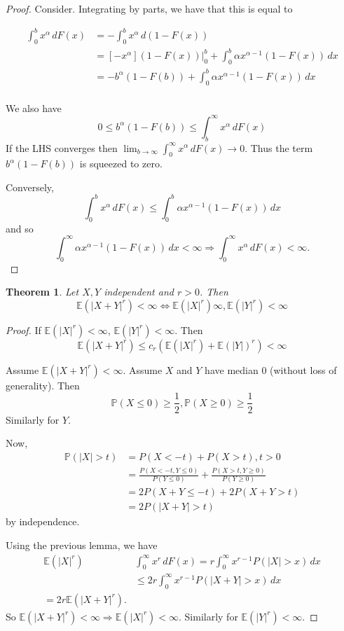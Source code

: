 \documentclass[10pt, oneside, reqno]{amsart}
\theoremstyle{plain}%
\newtheorem{thm}{Theorem}[section]
\theoremstyle{definition}
\theoremstyle{remark}
\newcommand{\E}{\mathbb{E}}
\renewcommand{\P}{\mathbb{P}}
\begin{document}
\begin{proof}
	Consider.  Integrating by parts, we have that this is equal to 

\begin{align*}
	\int_0^b x^{\alpha} \, dF(x) &= -\int_0^b x^\alpha \, d(1-F(x)) \\
							&= [-x^\alpha] (1-F(x))|_0^b + \int_0^b \alpha x^{\alpha - 1} (1 - F(x)) \, dx \\
							&= -b^{\alpha}(1-F(b)) + \int_0^b \alpha x^{\alpha - 1} (1 - F(x)) \, dx  \\
\end{align*}

We also have \[
	0 \leq b^\alpha (1-F(b)) \leq \int_b^\infty x^\alpha \, dF(x)
\]
If the LHS converges then $\lim_{b \rightarrow \infty} \int_0^\infty x^\alpha \, dF(x) \rightarrow 0$.  Thus the term $b^\alpha (1-F(b))$ is squeezed to zero.

Conversely, \[
	\int_0^b x^\alpha \, dF(x) \leq \int_0^b \alpha x^{\alpha - 1} (1-F(x)) \, dx
\] and so \[
	\int_0^\infty \alpha x^{\alpha - 1} (1-F(x)) \, dx < \infty \Rightarrow \int_0^\infty x^\alpha \, dF(x) < \infty.
\]
\end{proof}

\begin{thm}
	Let $X,Y$ independent and $r > 0$. Then \[
		\E( |X+Y|^r) <\infty  \iff \E(|X|^r) \infty, \E(|Y|^r) < \infty
	\] 
\end{thm}

\begin{proof}
	If $\E(|X|^r) < \infty$, $\E(|Y|^r) < \infty$.  Then \[
		\E(|X+Y|^r) \leq c_r (\E(|X|^r) + \E(|Y|)^r ) < \infty
	\]
	
	Assume $\E(|X+Y|^r) < \infty$.  Assume $X$ and $Y$ have median 0 (without loss of generality).  Then \[
		\P(X \leq 0) \geq \frac{1}{2}, \P(X \geq 0) \geq \frac{1}{2}
	\] Similarly for $Y$. 
	
	Now, \begin{align*}
		\P(|X| > t) &= P(X < -t) + P( X > t), t > 0 \\
					&= \frac{P(X  < -t, Y \leq 0)}{P(Y \leq 0)} + \frac{P(X > t, Y \geq 0)}{P(Y \geq 0)} \\
					&= 2 P(X+Y \leq -t) + 2 P(X+Y > t) \\
					&= 2 P(|X+Y| > t)
	\end{align*} by independence.
	
	Using the previous lemma, we have \begin{align*}
		\E(|X|^r) & \int_0^\infty x^r \, dF(x) = r \int_0^\infty x^{r-1} P(|X| > x) \, dx \\
							&\leq 2r \int_0^\infty x^{r-1} P(|X+Y| > x) \, dx \\
							= 2r \E(|X+Y|^r).
	\end{align*}  So $\E(|X+Y|^r) < \infty \Rightarrow \E(|X|^r) < \infty$.  Similarly for $\E(|Y|^r) < \infty$.  

\end{proof}
\end{document}
